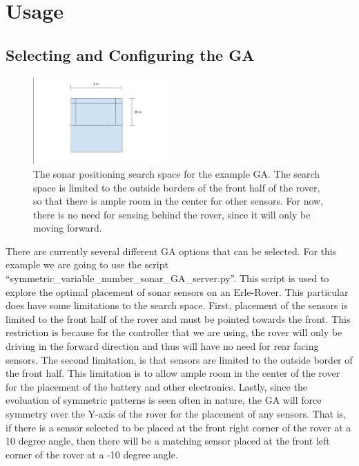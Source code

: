 \documentclass{report}
\begin{document}
\newpage
\section{Usage}
\subsection{Selecting and Configuring the GA}
\label{Selecting and Configuring the GA}

\begin{figure}
	\centering \includegraphics[width=0.45\textwidth]{Images/GA_Search_Space.png}
	\caption{The sonar positioning search space for the example GA. The search space is limited to the outside borders of the front half of the rover, so that there is ample room in the center for other sensors. For now, there is no need for sensing behind the rover, since it will only be moving forward.}
	\label{GA_Search_Space}	
\end{figure}

There are currently several different GA options that can be selected. For this example we are going to use the script ``symmetric\_variable\_number\_sonar\_GA\_server.py''. This script is used to explore the optimal placement of sonar sensors on an Erle-Rover. This particular does have some limitations to the search space. First, placement of the sensors is limited to the front half of the rover and must be pointed towards the front. This restriction is because for the controller that we are using, the rover will only be driving in the forward direction and thus will have no need for rear facing sensors. The second limitation, is that sensors are limited to the outside border of the front half. This limitation is to allow ample room in the center of the rover for the placement of the battery and other electronics. Lastly, since the evoluation of symmetric patterns is seen often in nature, the GA will force symmetry over the Y-axis of the rover for the placement of any sensors. That is, if there is a sensor selected to be placed at the front right corner of the rover at a 10 degree angle, then there will be a matching sensor placed at the front left corner of the rover at a -10 degree angle.
\end{document}
